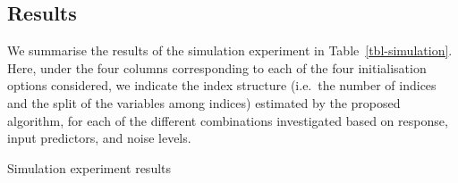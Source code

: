 \documentclass[11pt,a4paper,]{article}
\begin{document}
\hypertarget{sec-sim-results}{%
\subsection{Results}\label{sec-sim-results}}

We summarise the results of the simulation experiment in
Table~\ref{tbl-simulation}. Here, under the four columns corresponding
to each of the four initialisation options considered, we indicate the
index structure (i.e.~the number of indices and the split of the
variables among indices) estimated by the proposed algorithm, for each
of the different combinations investigated based on response, input
predictors, and noise levels.

\hypertarget{tbl-simulation}{}
\begin{table}[!h]
\caption{\label{tbl-simulation}Simulation experiment results }\tabularnewline


\end{table}
\end{document}
